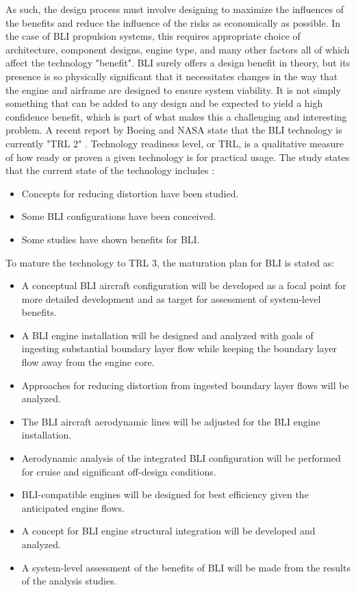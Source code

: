 \documentclass[12pt]{gatech-thesis}
\begin{document}
\indent As such, the design process must involve designing to maximize the influences of the benefits and reduce the influence of the risks as economically as possible. In the case of BLI propulsion systems, this requires appropriate choice of architecture, component designs, engine type, and many other factors all of which affect the technology "benefit". BLI surely offers a design benefit in theory, but its presence is so physically significant that it necessitates changes in the way that the engine and airframe are designed to ensure system viability. It is not simply something that can be added to any design and be expected to yield a high confidence benefit, which is part of what makes this a challenging and interesting problem.
\indent A recent report by Boeing and NASA state that the BLI technology is currently "TRL 2" \cite{Bradley2012}.  Technology readiness level, or TRL, is a qualitative measure of how ready or proven a given technology is for practical usage.  The study states that the current state of the technology includes \cite{Bradley2012}:
\begin{itemize}
\item{Concepts for reducing distortion have been studied.}
\item{Some BLI configurations have been conceived.}
\item{Some studies have shown benefits for BLI.}
\end{itemize}

To mature the technology to TRL 3, the maturation plan for BLI is stated as:

\begin{itemize}
\item{A conceptual BLI aircraft configuration will be developed as a focal point for more detailed
development and as target for assessment of system-level benefits.}
\item{A BLI engine installation will be designed and analyzed with goals of ingesting substantial
boundary layer flow while keeping the boundary layer flow away from the engine core.}
\item{Approaches for reducing distortion from ingested boundary layer flows will be analyzed.}
\item{The BLI aircraft aerodynamic lines will be adjusted for the BLI engine installation.}
\item{Aerodynamic analysis of the integrated BLI configuration will be performed for cruise and
significant off-design conditions.}
\item{BLI-compatible engines will be designed for best efficiency given the anticipated engine flows.}
\item{A concept for BLI engine structural integration will be developed and analyzed.}
\item{A system-level assessment of the benefits of BLI will be made from the results of the analysis
studies.}
\end{itemize}
\end{document}
